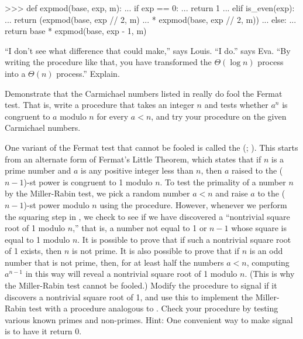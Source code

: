 \begin{exerciseGroup}
\begin{codeBlock}
>>> def expmod(base, exp, m):
...     if exp == 0:
...         return 1
...     elif is_even(exp):
...         return (expmod(base, exp // 2, m)
...                 * expmod(base, exp // 2, m)) %
...     else:
...         return base * expmod(base, exp - 1, m) %
\end{codeBlock}

``I don't see what difference that could make,'' says Louis.  ``I do.''  says
Eva.  ``By writing the procedure like that, you have transformed the
\( \Theta(\log n) \) process into a \( \Theta(n) \) process.''
Explain.

\label{Exercise 1.27}
 Demonstrate that the Carmichael
numbers listed in  really do fool the Fermat test.  That is,
write a procedure that takes an integer \( n \) and tests whether \( a^n \) is
congruent to \( a \) modulo \( n \) for every \( a < n \), and try your procedure
on the given Carmichael numbers.

\label{Exercise 1.28}
 One variant of the Fermat test
that cannot be fooled is called the  (;
).  This starts from an alternate form of Fermat's Little Theorem,
which states that if \( n \) is a prime number and \( a \) is any positive integer
less than \( n \), then \( a \) raised to the (\( n-1 \))-st power is congruent to 1
modulo \( n \).  To test the primality of a number \( n \) by the Miller-Rabin
test, we pick a random number \( a < n \) and raise \( a \) to the (\( n-1 \))-st
power modulo \( n \) using the  procedure.  However, whenever we
perform the squaring step in , we check to see if we have
discovered a ``nontrivial square root of 1 modulo \( n \),'' that is, a number
not equal to 1 or \( n-1 \) whose square is equal to 1 modulo \( n \).  It is
possible to prove that if such a nontrivial square root of 1 exists, then \( n \)
is not prime.  It is also possible to prove that if \( n \) is an odd number that
is not prime, then, for at least half the numbers \( a < n \), computing
\( a^{n-1} \) in this way will reveal a nontrivial square root of 1 modulo
\( n \).  (This is why the Miller-Rabin test cannot be fooled.)  Modify the
 procedure to signal if it discovers a nontrivial square root of
1, and use this to implement the Miller-Rabin test with a procedure analogous
to .  Check your procedure by testing various known primes
and non-primes.  Hint: One convenient way to make  signal is to
have it return 0.
\end{exerciseGroup}

